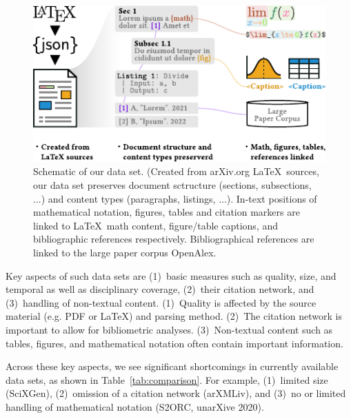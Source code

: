 \begin{figure}[tb]
  \centering
  \includegraphics[width=\linewidth]{figures/ref_covgran/schema}
  \caption[Schematic of our data set]{Schematic of our data set. (Created from arXiv.org \LaTeX\ sources, our data set preserves document sctructure (sections, subsections, ...) and content types (paragraphs, listings, ...). In-text positions of mathematical notation, figures, tables and citation markers are linked to \LaTeX\ math content, figure/table captions, and bibliographic references respectively. Bibliographical references are linked to the large paper corpus OpenAlex.}
  \label{fig:schema}
\end{figure}


Key aspects of such data sets are (1)~basic measures such as quality, size, and temporal as well as disciplinary coverage, (2)~their citation network, and (3)~handling of non-textual content. (1)~Quality is affected by the source material (e.g. PDF or \LaTeX) and parsing method. (2)~The citation network is important to allow for bibliometric analyses. (3)~Non-textual content such as tables, figures, and mathematical notation often contain important information.

Across these key aspects, we see significant shortcomings in currently available data sets, as shown in Table~\ref{tab:comparison}. For example, (1)~limited size (SciXGen), (2)~omission of a citation network (arXMLiv), and (3)~no or limited handling of mathematical notation (S2ORC, unarXive 2020).

